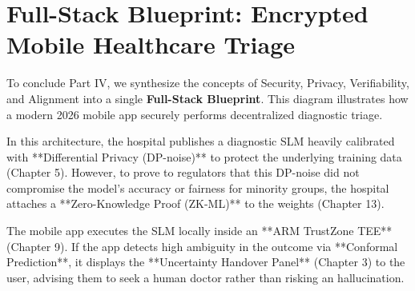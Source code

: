 \section{Full-Stack Blueprint: Encrypted Mobile Healthcare Triage}
\label{sec:blueprint_mobile_health}

To conclude Part IV, we synthesize the concepts of Security, Privacy, Verifiability, and Alignment into a single \textbf{Full-Stack Blueprint}. This diagram illustrates how a modern 2026 mobile app securely performs decentralized diagnostic triage. 

In this architecture, the hospital publishes a diagnostic SLM heavily calibrated with **Differential Privacy (DP-noise)** to protect the underlying training data (Chapter 5). However, to prove to regulators that this DP-noise did not compromise the model's accuracy or fairness for minority groups, the hospital attaches a **Zero-Knowledge Proof (ZK-ML)** to the weights (Chapter 13). 

The mobile app executes the SLM locally inside an **ARM TrustZone TEE** (Chapter 9). If the app detects high ambiguity in the outcome via **Conformal Prediction**, it displays the **Uncertainty Handover Panel** (Chapter 3) to the user, advising them to seek a human doctor rather than risking an hallucination.

